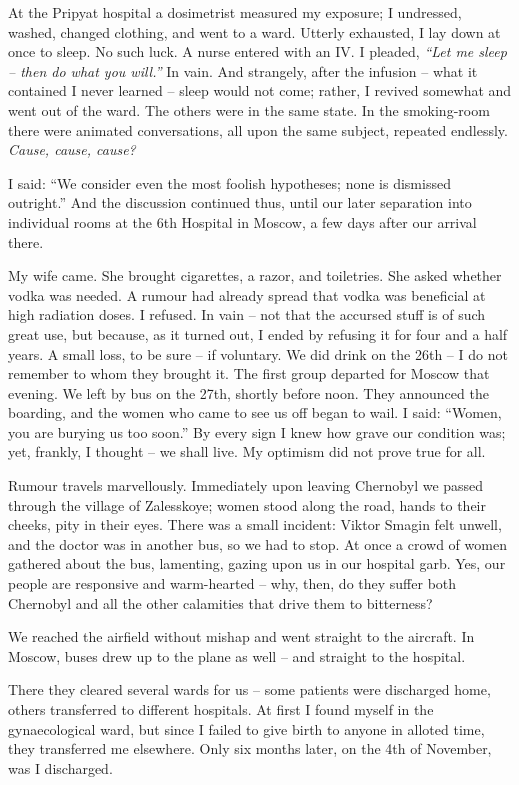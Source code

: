\documentclass[openright]{bookest}
\begin{document}

At the Pripyat hospital a dosimetrist measured my exposure; I undressed, washed, changed clothing, and went to a ward. Utterly exhausted, I lay down at once to sleep. No such luck. A nurse entered with an IV. I pleaded, \textit{``Let me sleep -- then do what you will.''} In vain. And strangely, after the infusion -- what it contained I never learned -- sleep would not come; rather, I revived somewhat and went out of the ward. The others were in the same state. In the smoking-room there were animated conversations, all upon the same subject, repeated endlessly. \textit{Cause, cause, cause?}

I said: ``We consider even the most foolish hypotheses; none is dismissed outright.'' And the discussion continued thus, until our later separation into individual rooms at the 6th Hospital in Moscow, a few days after our arrival there.

My wife came. She brought cigarettes, a razor, and toiletries. She asked whether vodka was needed. A rumour had already spread that vodka was beneficial at high radiation doses. I refused. In vain -- not that the accursed stuff is of such great use, but because, as it turned out, I ended by refusing it for four and a half years. A small loss, to be sure -- if voluntary. We did drink on the 26th -- I do not remember to whom they brought it. The first group departed for Moscow that evening. We left by bus on the 27th, shortly before noon. They announced the boarding, and the women who came to see us off began to wail. I said: ``Women, you are burying us too soon.'' By every sign I knew how grave our condition was; yet, frankly, I thought -- we shall live. My optimism did not prove true for all.

Rumour travels marvellously. Immediately upon leaving Chernobyl we passed through the village of Zalesskoye; women stood along the road, hands to their cheeks, pity in their eyes. There was a small incident: Viktor Smagin felt unwell, and the doctor was in another bus, so we had to stop. At once a crowd of women gathered about the bus, lamenting, gazing upon us in our hospital garb. Yes, our people are responsive and warm-hearted -- why, then, do they suffer both Chernobyl and all the other calamities that drive them to bitterness?

We reached the airfield without mishap and went straight to the aircraft. In Moscow, buses drew up to the plane as well -- and straight to the hospital.

There they cleared several wards for us -- some patients were discharged home, others transferred to different hospitals. At first I found myself in the gynaecological ward, but since I failed to give birth to anyone in alloted time, they transferred me elsewhere. Only six months later, on the 4th of November, was I discharged.
\end{document}
